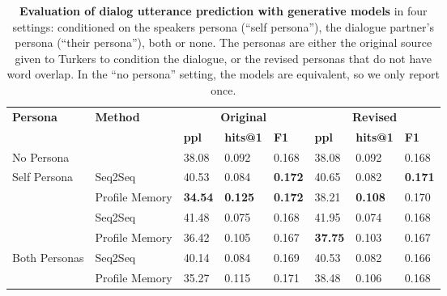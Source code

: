 
\begin{table*}[t]
  \centering
  \begin{tabular}{llllllll}
  \toprule
  \multirow{2}{*}{\textbf{Persona}} & \multirow{2}{*}{\textbf{Method}} & \multicolumn{3}{c}{\textbf{Original}} & \multicolumn{3}{c}{\textbf{Revised}}\\
  & & \textbf{ppl} & \textbf{hits@1} & \textbf{F1}&\textbf{ppl} & \textbf{hits@1} & \textbf{F1}\\
  \midrule
  No Persona & & 38.08 & 0.092 & 0.168&38.08 & 0.092&0.168\\\midrule
  \multirow{3}{*}{Self Persona} & Seq2Seq & 40.53 & 0.084 &\textbf{0.172}& 40.65  & 0.082&\textbf{0.171}\\
   & Profile Memory & \textbf{34.54} & \textbf{0.125} &\textbf{0.172}& 38.21 & \textbf{0.108}&0.170\\\midrule
  \multirow{3}{*}{Their Persona} & Seq2Seq & 41.48 & 0.075 &0.168& 41.95 & 0.074&0.168\\
   & Profile Memory & 36.42 & 0.105 &0.167& \textbf{37.75} & 0.103&0.167\\\midrule
  \multirow{3}{*}{Both Personas} & Seq2Seq & 40.14 & 0.084 &0.169& 40.53 & 0.082&0.166\\
   & Profile Memory & 35.27 & 0.115 &0.171& 38.48 & 0.106&0.168\\ 
  \bottomrule
  \end{tabular}
  \caption{{\bf Evaluation of dialog utterance prediction with generative models} in four settings: conditioned on the speakers persona (``self persona''), the dialogue partner's persona (``their persona''), both or none. The personas are either the original source given to Turkers to condition the dialogue, or the revised personas that do not have word overlap. In the ``no persona'' setting, the models are equivalent, so we only report once.
     \label{tab:generative-results}
     }
\end{table*}



